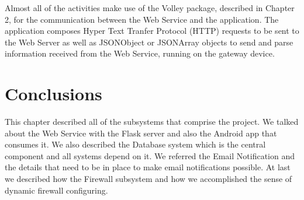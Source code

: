 Almost all of the activities make use of the Volley package, described in
Chapter 2, for the communication between the Web Service and the application.
The application composes Hyper Text Tranfer Protocol (HTTP) requests to be sent
to the Web Server as well as JSONObject or JSONArray objects to send and parse
information received from the Web Service, running on the gateway device.

\section{Conclusions}
\label{chap4:sec:concs}
This chapter described all of the subsystems that comprise the project. We
talked about the Web Service with the Flask server and also the Android app that
consumes it. We also described the Database system which is the central
component and all systems depend on it. We referred the Email Notification and
the details that need to be in place to make email notifications possible. At
last we described how the Firewall subsystem and how we accomplished the sense
of dynamic firewall configuring.
